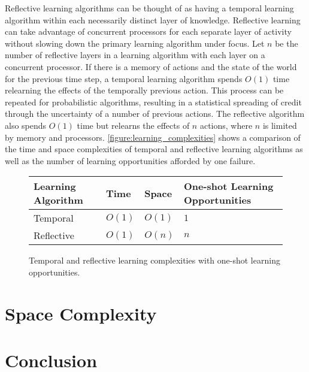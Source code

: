 Reflective learning algorithms can be thought of as having a temporal
learning algorithm within each necessarily distinct layer of
knowledge.  Reflective learning can take advantage of concurrent
processors for each separate layer of activity without slowing down
the primary learning algorithm under focus.  Let $n$ be the number of
reflective layers in a learning algorithm with each layer on a
concurrent processor.  If there is a memory of actions and the state
of the world for the previous time step, a temporal learning algorithm
spends $O(1)$ time relearning the effects of the temporally previous
action.  This process can be repeated for probabilistic algorithms,
resulting in a statistical spreading of credit through the uncertainty
of a number of previous actions.  The reflective algorithm also spends
$O(1)$ time but relearns the effects of $n$ actions, where $n$ is
limited by memory and processors.
{\mbox{\autoref{figure:learning_complexities}}} shows a comparison of
the time and space complexities of temporal and reflective learning
algorithms as well as the number of learning opportunities afforded by
one failure.
\begin{figure}
\center
\begin{tabular}{p{2cm}|p{2cm}|p{2cm}|p{3cm}}
Learning Algorithm & Time   & Space  & One-shot Learning Opportunities \\ \hline
Temporal           & $O(1)$ & $O(1)$ & $1$ \\
Reflective         & $O(1)$ & $O(n)$ & $n$ \\
\end{tabular}
\caption{Temporal and reflective learning complexities with one-shot learning opportunities.}
\label{figure:learning_complexities}
\end{figure}

\section{Space Complexity}

\section{Conclusion}



